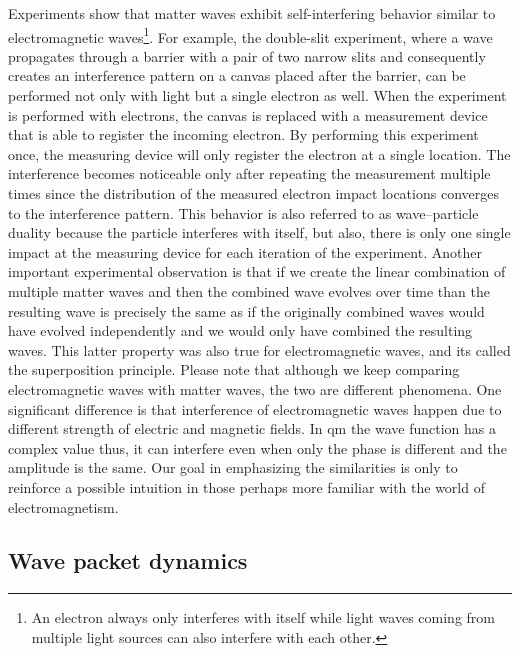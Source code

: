 Experiments show that matter waves exhibit self-interfering behavior similar to electromagnetic waves\footnote{An electron always only interferes with itself while light waves coming from multiple light sources can also interfere with each other.}.
For example, the double-slit experiment, where a wave propagates through a barrier with a pair of two narrow slits and consequently creates an interference pattern on a canvas placed after the barrier, can be performed not only with light but a single electron as well.
When the experiment is performed with electrons, the canvas is replaced with a measurement device that is able to register the incoming electron.
By performing this experiment once, the measuring device will only register the electron at a single location.
The interference becomes noticeable only after repeating the measurement multiple times since the distribution of the measured electron impact locations converges to the interference pattern.
This behavior is also referred to as wave–particle duality because the particle interferes with itself, but also, there is only one single impact at the measuring device for each iteration of the experiment.
Another important experimental observation is that if we create the linear combination of multiple matter waves and then the combined wave evolves over time than the resulting wave is precisely the same as if the originally combined waves would have evolved independently and we would only have combined the resulting waves.
This latter property was also true for electromagnetic waves, and its called the superposition principle.
Please note that although we keep comparing electromagnetic waves with matter waves, the two are different phenomena.
One significant difference is that interference of electromagnetic waves happen due to different strength of electric and magnetic fields.
In \acrshort{qm} the wave function has a complex value thus, it can interfere even when only the phase is different and the amplitude is the same.
Our goal in emphasizing the similarities is only to reinforce a possible intuition in those perhaps more familiar with the world of electromagnetism.

\subsection{Wave packet dynamics}

